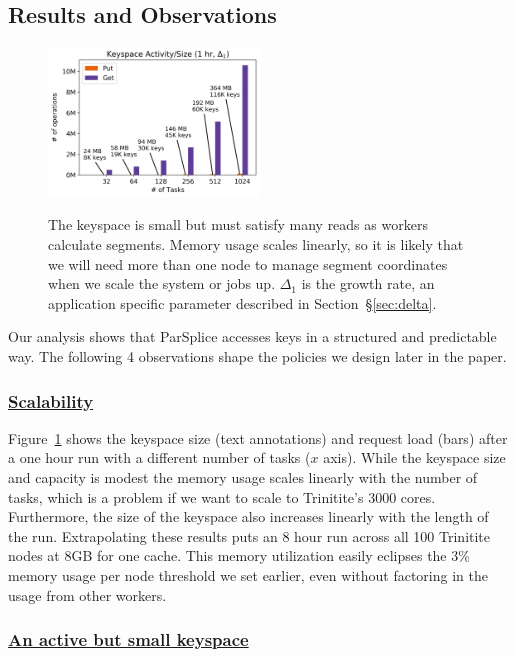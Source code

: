 \subsection{Results and Observations}
\label{sec:parsplice-keyspace-analysis}

\begin{figure}[t]
  \noindent\includegraphics[width=0.5\textwidth]{figures/methodology-keyspace.png}\\
  \caption{The keyspace is small but must satisfy many reads as workers
  calculate segments. Memory usage scales linearly, so it is likely that we will
  need more than one node to manage segment coordinates when we scale the system
  or jobs up. \(\Delta_1\) is the growth rate, an application specific parameter
  described in Section~\S\ref{sec:delta}.
  \label{fig:methodology-keyspace}}
\end{figure}

Our analysis shows that ParSplice accesses keys in a structured and predictable
way. The following 4 observations shape the policies we design later in the
paper.

\subsubsection{\underline{Scalability}} Figure~\ref{fig:methodology-keyspace} shows the
keyspace size (text annotations) and request load (bars) after a one hour run
with a different number of tasks (\(x\) axis). While the keyspace size and
capacity is modest the memory usage scales linearly with the number
of tasks, which is a problem if we want to scale to Trinitite's 3000 cores.
Furthermore, the size of the keyspace also increases linearly with the length
of the run.  Extrapolating these results puts an 8 hour run across all 100
Trinitite nodes at 8GB for one cache.  This memory utilization easily eclipses
the 3\% memory usage per node threshold we set earlier, even without factoring
in the usage from other workers.

\subsubsection{\underline{An active but small keyspace}}

